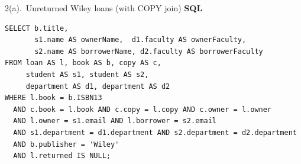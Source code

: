 \documentclass{beamer}
\begin{document}
\begin{frame}[fragile]{2(a).\ Unreturned Wiley loans (with COPY join)}
\small
\textbf{SQL}
\begin{lstlisting}[style=sqlcompact]
SELECT b.title,
       s1.name AS ownerName,  d1.faculty AS ownerFaculty,
       s2.name AS borrowerName, d2.faculty AS borrowerFaculty
FROM loan AS l, book AS b, copy AS c,
     student AS s1, student AS s2,
     department AS d1, department AS d2
WHERE l.book = b.ISBN13
  AND c.book = l.book AND c.copy = l.copy AND c.owner = l.owner
  AND l.owner = s1.email AND l.borrower = s2.email
  AND s1.department = d1.department AND s2.department = d2.department
  AND b.publisher = 'Wiley'
  AND l.returned IS NULL;
\end{lstlisting}
\end{frame}

\end{document}
